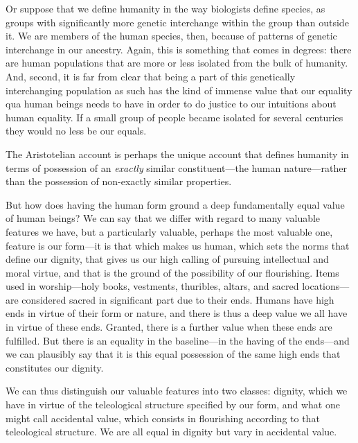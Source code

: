 Or suppose that we define humanity in the way biologists define species, as groups with significantly more genetic interchange
within the group than outside it. We are members of the human species, then, because of patterns of genetic interchange in our
ancestry. Again, this is something that comes in degrees: there are human populations that are more or less isolated from the 
bulk of humanity. And, second, it is far from clear that being a part of this genetically interchanging population as such
has the kind of immense value that our equality qua human beings needs to have in order to do justice to our intuitions about
human equality. If a small group of people became isolated for several centuries they would no less be our equals.

The Aristotelian account is perhaps the unique account that defines humanity in terms of possession of an \textit{exactly}
similar constituent---the human nature---rather than the possession of non-exactly similar properties. 

But how does having the human form ground a deep fundamentally equal value of human beings? We can say that we differ with regard 
to many valuable features we have, but a particularly valuable, perhaps the most valuable one, feature is our form---it is 
that which makes us human, which sets the norms that define our dignity, that gives us our high calling of pursuing intellectual and moral virtue, and 
that is the ground of the possibility of our flourishing. Items used in  worship---holy books, vestments, thuribles, 
altars, and sacred locations---are considered sacred in significant part due to their ends. Humans have high ends in
virtue of their form or nature, and there is thus a
deep value we all have in virtue of these ends. Granted, there is a further value when these ends are fulfilled. 
But there is an equality in the baseline---in the having of the ends---and we can plausibly say that it is this equal
possession of the same high ends that constitutes our dignity. 

We can thus distinguish our valuable features into two classes: dignity, which we have in virtue of the teleological structure
specified by our form, and what one might call accidental value, which consists in flourishing according to that teleological structure.
We are all equal in dignity but vary in accidental value. 


